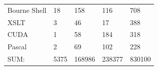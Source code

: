 \begin{appendix}
\begin{table}[htbp]
\begin{longtable}{ l|l|l|l|l }
        Bourne Shell                   &  18          &  158         &   116        &    708\\
        XSLT                           &   3          &   46         &    17        &    388\\
        CUDA                           &   1          &   58         &   184        &    318\\
        Pascal                         &   2          &   69         &   102        &    228\\
        \hline
        SUM:                           &5375         &168986         &238377         &830100\\
        \hline
    \end{longtable}
    \normalfont
    \label{table:ParaviewStatistic}
\end{table}


\end{appendix}
